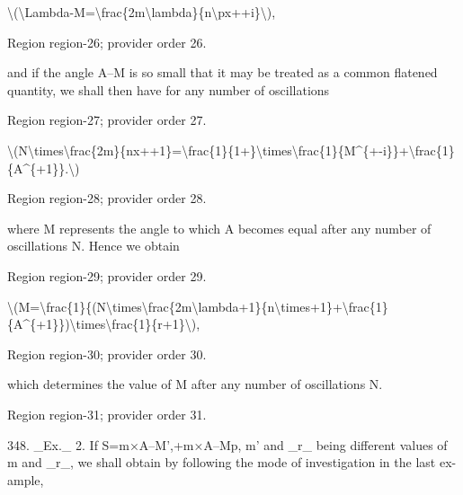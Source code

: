 \documentclass[11pt]{article}
\begin{document}
\textbackslash{}(\textbackslash{}Lambda-M=\textbackslash{}frac\{2m\textbackslash{}lambda\}\{n\textbackslash{}px++i\}\textbackslash{}),
\par

{\scriptsize\color{gray} Region region-26; provider order 26.\par}
\medskip

and if the angle A--M is so small that it may be treated as a common flatened quantity, we shall then have for any number of oscillations
\par

{\scriptsize\color{gray} Region region-27; provider order 27.\par}
\medskip

\textbackslash{}(N\textbackslash{}times\textbackslash{}frac\{2m\}\{nx++1\}=\textbackslash{}frac\{1\}\{1+\}\textbackslash{}times\textbackslash{}frac\{1\}\{M\textasciicircum{}\{+-i\}\}+\textbackslash{}frac\{1\}\{A\textasciicircum{}\{+1\}\}.\textbackslash{})
\par

{\scriptsize\color{gray} Region region-28; provider order 28.\par}
\medskip

where M represents the angle to which A becomes equal after any number of oscillations N. Hence we obtain
\par

{\scriptsize\color{gray} Region region-29; provider order 29.\par}
\medskip

\textbackslash{}(M=\textbackslash{}frac\{1\}\{(N\textbackslash{}times\textbackslash{}frac\{2m\textbackslash{}lambda+1\}\{n\textbackslash{}times+1\}+\textbackslash{}frac\{1\}\{A\textasciicircum{}\{+1\}\})\textbackslash{}times\textbackslash{}frac\{1\}\{r+1\}\textbackslash{}),
\par

{\scriptsize\color{gray} Region region-30; provider order 30.\par}
\medskip

which determines the value of M after any number of oscillations N.
\par

{\scriptsize\color{gray} Region region-31; provider order 31.\par}
\medskip

348. \_Ex.\_ 2. If S=m×A--M’,+m×A--Mp, m’ and \_r\_ being different values of m and \_r\_, we shall obtain by following the mode of investigation in the last ex- ample,
\par
\end{document}
